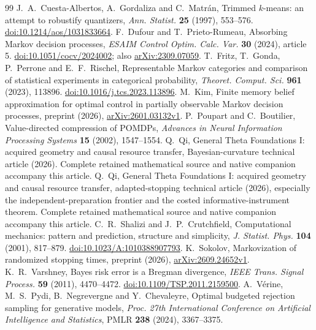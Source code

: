 \begin{thebibliography}{99}
 J.~A.~Cuesta-Albertos, A.~Gordaliza and C.~Matr\'an, Trimmed $k$-means: an attempt to robustify quantizers, \emph{Ann. Statist.} \textbf{25} (1997), 553--576. \href{https://doi.org/10.1214/aos/1031833664}{doi:10.1214/aos/1031833664}.
 F.~Dufour and T.~Prieto-Rumeau, Absorbing Markov decision processes, \emph{ESAIM Control Optim. Calc. Var.} \textbf{30} (2024), article 5. \href{https://doi.org/10.1051/cocv/2024002}{doi:10.1051/cocv/2024002}; also \href{https://arxiv.org/abs/2309.07059}{arXiv:2309.07059}.
 T.~Fritz, T.~Gonda, P.~Perrone and E.~F.~Rischel, Representable Markov categories and comparison of statistical experiments in categorical probability, \emph{Theoret. Comput. Sci.} \textbf{961} (2023), 113896. \href{https://doi.org/10.1016/j.tcs.2023.113896}{doi:10.1016/j.tcs.2023.113896}.
 M.~Kim, Finite memory belief approximation for optimal control in partially observable Markov decision processes, preprint (2026), \href{https://arxiv.org/abs/2601.03132v1}{arXiv:2601.03132v1}.
 P.~Poupart and C.~Boutilier, Value-directed compression of POMDPs, \emph{Advances in Neural Information Processing Systems} \textbf{15} (2002), 1547--1554.
 Q.~Qi, General Theta Foundations I: acquired geometry and causal resource transfer, Bayesian-curvature technical article (2026). Complete retained mathematical source and native companion accompany this article.
 Q.~Qi, General Theta Foundations I: acquired geometry and causal resource transfer, adapted-stopping technical article (2026), especially the independent-preparation frontier and the costed informative-instrument theorem. Complete retained mathematical source and native companion accompany this article.
 C.~R.~Shalizi and J.~P.~Crutchfield, Computational mechanics: pattern and prediction, structure and simplicity, \emph{J. Statist. Phys.} \textbf{104} (2001), 817--879. \href{https://doi.org/10.1023/A:1010388907793}{doi:10.1023/A:1010388907793}.
 K.~Sokolov, Markovization of randomized stopping times, preprint (2026), \href{https://arxiv.org/abs/2609.24652v1}{arXiv:2609.24652v1}.
 K.~R.~Varshney, Bayes risk error is a Bregman divergence, \emph{IEEE Trans. Signal Process.} \textbf{59} (2011), 4470--4472. \href{https://doi.org/10.1109/TSP.2011.2159500}{doi:10.1109/TSP.2011.2159500}.
 A.~V\'erine, M.~S.~Pydi, B.~Negrevergne and Y.~Chevaleyre, Optimal budgeted rejection sampling for generative models, \emph{Proc. 27th International Conference on Artificial Intelligence and Statistics}, PMLR \textbf{238} (2024), 3367--3375.
\end{thebibliography}
